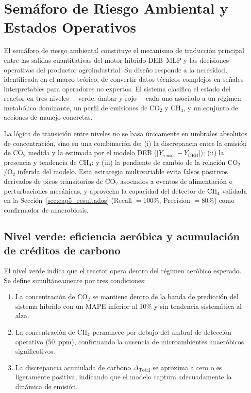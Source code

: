 \section{Semáforo de Riesgo Ambiental y Estados Operativos}
\label{sec:cap5_semaforo}

El semáforo de riesgo ambiental constituye el mecanismo de traducción principal entre las salidas cuantitativas del motor híbrido DEB--MLP y las decisiones operativas del productor agroindustrial. Su diseño responde a la necesidad, identificada en el marco teórico, de convertir datos técnicos complejos en señales interpretables para operadores no expertos. El sistema clasifica el estado del reactor en tres niveles ---verde, ámbar y rojo--- cada uno asociado a un régimen metabólico dominante, un perfil de emisiones de CO$_2$ y CH$_4$, y un conjunto de acciones de manejo concretas.

La lógica de transición entre niveles no se basa únicamente en umbrales absolutos de concentración, sino en una combinación de: (i) la discrepancia entre la emisión de CO$_2$ medida y la estimada por el modelo DEB ($|Y_{\mathrm{sensor}} - Y_{\mathrm{DEB}}|$); (ii) la presencia y tendencia de CH$_4$; y (iii) la pendiente de cambio de la relación CO$_2$/O$_2$ inferida del modelo. Esta estrategia multivariable evita falsos positivos derivados de picos transitorios de CO$_2$ asociados a eventos de alimentación o perturbaciones mecánicas, y aprovecha la capacidad del detector de CH$_4$ validada en la Sección~\ref{sec:cap5_resultados} (Recall $= 100$\%, Precision $= 80$\%) como confirmador de anaerobiosis.

\subsection{Nivel verde: eficiencia aeróbica y acumulación de créditos de carbono}
\label{subsec:cap5_verde}

El nivel verde indica que el reactor opera dentro del régimen aeróbico esperado. Se define simultáneamente por tres condiciones:

\begin{enumerate}
    \item La concentración de CO$_2$ se mantiene dentro de la banda de predicción del sistema híbrido con un MAPE inferior al 10\% y sin tendencia sistemática al alza.
    \item La concentración de CH$_4$ permanece por debajo del umbral de detección operativo (50~ppm), confirmando la ausencia de microambientes anaeróbicos significativos.
    \item La discrepancia acumulada de carbono $\Delta_{\mathrm{Total}}$ se aproxima a cero o es ligeramente positiva, indicando que el modelo captura adecuadamente la dinámica de emisión.
\end{enumerate}

